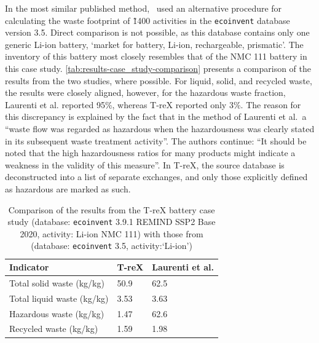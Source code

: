 \documentclass[a4paper,fleqn]{cas-dc}
\begin{document}
	In the most similar published method,~\cite{laurenti2023wastefootprint} used an
	alternative procedure for calculating the waste footprint of \~1400 activities
	in the \texttt{ecoinvent} database version 3.5. Direct comparison is not
	possible, as this database contains only one generic Li-ion battery, `market
	for battery, Li-ion, rechargeable, prismatic'. The inventory of this battery
	most closely resembles that of the NMC 111 battery in this case study.
	\autoref{tab:results-case_study-comparison} presents a comparison of the
	results from the two studies, where possible. For liquid, solid, and recycled
	waste, the results were closely aligned, however, for the hazardous waste
	fraction, Laurenti et al. reported 95\%, whereas T-reX reported only 3\%. The
	reason for this discrepancy is explained by the fact that in the method of
	Laurenti et al.\, a ``waste flow was regarded as hazardous when the
	hazardousness was clearly stated in its subsequent waste treatment activity''.
	The authors continue: ``It should be noted that the high hazardousness ratios
	for many products might indicate a weakness in the validity of this measure''.
	In T-reX, the source database is deconstructed into a list of separate
	exchanges, and only those explicitly defined as hazardous are marked as such.
	
	\begin{table}
		\centering
		\caption{Comparison of the results from the T-reX battery case study (database: \texttt{ecoinvent} 3.9.1 REMIND SSP2 Base 2020, activity: Li-ion NMC 111) with those from \cite{laurenti2023wastefootprint} (database: \texttt{ecoinvent} 3.5, activity:`Li-ion')}\label{tab:results-case_study-comparison}
		\begin{tabular}{lll}
			\toprule
			\textbf{Indicator}         & \textbf{T-reX} & \textbf{Laurenti et al.} \\
			\midrule
			Total solid waste (kg/kg)  & 50.9           & 62.5                     \\
			Total liquid waste (kg/kg) & 3.53           & 3.63                     \\
			Hazardous waste (kg/kg)    & 1.47           & 62.6                     \\
			Recycled waste (kg/kg)     & 1.59           & 1.98                     \\
			\bottomrule
		\end{tabular}
	\end{table}
	
\end{document}
